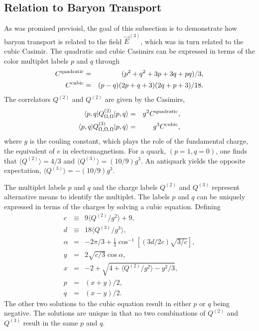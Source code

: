 \documentclass[aps, prc, 12pt, nofootinbib, showpacs, superscriptaddress, tightenlines, groupedaddress]{revtex4-2}
\begin{document}
\subsection{Relation to Baryon Transport}

As was promised previoisl, the goal of this subsection is to demonstrate how baryon transport is related to the field $\vec{E}^{(3)}$, which was in turn related to the cubic Casimir. The quadratic and cubic Casimirs can be expressed in terms of the color multiplet labels $p$ and $q$ through
\begin{eqnarray}\label{eq:Q2Q3vspq}
C^{\rm quadratic}&=&(p^2+q^2+3p+3q+pq)/3,\\
C^{\rm cubic}&=&(p-q)(2p+q+3)(2q+p+3)/18.
\end{eqnarray}
The correlators $Q^{(2)}$ and $Q^{(2)}$ are given by the Casimirs,
\begin{eqnarray}
\langle p,q|Q^{(2)}_{\Omega,\Omega}|p,q\rangle&=&g^2C^{\rm quadratic},\\
\langle p,q|Q^{(3)}_{\Omega,\Omega,\Omega}|p,q\rangle&=&g^3C^{\rm cubic},\\
\end{eqnarray}
where $g$ is the couling constant, which plays the role of the fundamental charge, the equivalent of $e$ in electromagnetism. For a quark, $(p=1,q=0)$, one finds that $\langle Q^{(2)}\rangle=4/3$ and $\langle Q^{(3)}\rangle=(10/9)g^3$. An antiquark yields the opposite expectation,  $\langle Q^{(3)}\rangle=-(10/9)g^3$.

The multiplet labels $p$ and $q$ and the charge labels $Q^{(2)}$ and $Q^{(3)}$ represent alternative means to identify the multiplet. The labels $p$ and $q$ can be uniquely expressed in terms of the charges by solving a cubic equation. Defining
\begin{eqnarray}
c&\equiv&9\langle Q^{(2)}/g^2\rangle+9,\\
\nonumber
d&\equiv&18\langle Q^{(3)}/g^3\rangle,\\
\nonumber
\alpha&=&-2\pi /3+\frac{1}{3}\cos^{-1}[(3d/2c)\sqrt{3/c}],\\
\nonumber
y&=&2\sqrt{c/3}\cos\alpha,\\
\nonumber
x&=&-2+\sqrt{4+\langle Q^{(2)}/g^2\rangle-y^2/3},\\
\nonumber
p&=&(x+y)/2,\\
\nonumber
q&=&(x-y)/2.
\end{eqnarray}
The other two solutions to the cubic equation result in either $p$ or $q$ being negative. The solutions are unique in that no two combinations of  $Q^{(2)}$ and $Q^{(3)}$ result in the same $p$ and $q$.
\end{document}
